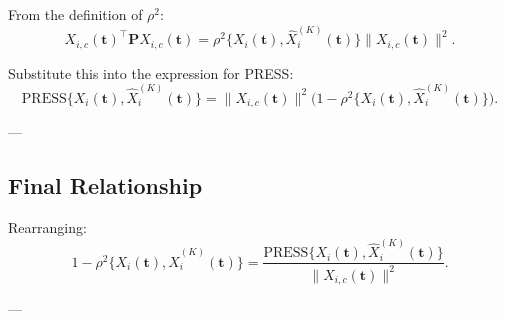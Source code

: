 From the definition of \( \rho^2 \):
\[
X_{i,c}(\mathbf{t})^\top \mathbf{P} X_{i,c}(\mathbf{t}) 
= \rho^2 \bigg\{ X_{i}(\mathbf{t}), \widehat{X}^{(K)}_{i} (\mathbf{t}) \bigg\} \bigg\| X_{i,c}(\mathbf{t}) \bigg\|^2.
\]

Substitute this into the expression for PRESS:
\[
\text{PRESS}\bigg\{ X_{i}(\mathbf{t}), \widehat{X}^{(K)}_{i} (\mathbf{t}) \bigg\}
= \bigg\| X_{i,c}(\mathbf{t}) \bigg\|^2 \bigg( 1 - \rho^2 \bigg\{ X_{i}(\mathbf{t}), \widehat{X}^{(K)}_{i} (\mathbf{t}) \bigg\} \bigg).
\]

---

\subsection*{Final Relationship}

Rearranging:
\[
1 - \rho^2 \bigg\{ X_{i}(\mathbf{t}), \widehat{X}^{(K)}_{i} (\mathbf{t}) \bigg\}
= \frac{\text{PRESS}\bigg\{ X_{i}(\mathbf{t}), \widehat{X}^{(K)}_{i} (\mathbf{t}) \bigg\}}
{\bigg\| X_{i,c}(\mathbf{t}) \bigg\|^2}.
\]

---